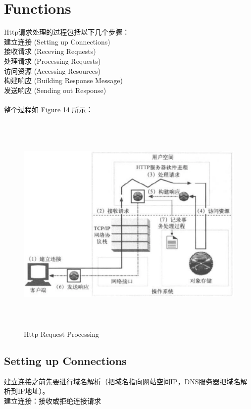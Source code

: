 \documentclass{article}
\begin{document}
	\section{Functions}
	\begin{CJK}{UTF8}{gbsn}
		Http请求处理的过程包括以下几个步骤：\\
		\indent 建立连接 (Setting up Connections)\\
		\indent 接收请求 (Receving Requests)\\
		\indent 处理请求 (Processing Requests)\\
		\indent 访问资源 (Accessing Resources)\\
		\indent 构建响应 (Building Response Message)\\
		\indent 发送响应 (Sending out Response)\\
		\hspace*{\fill} \\ %
		整个过程如 Figure 14 所示：
	\end{CJK}{}

	\begin{figure}[H]
		\centering
		\includegraphics[height = 11cm, width = 16cm]{pics/27_http_procedure.png}	
		\caption{Http Request Processing}
	\end{figure}

	\subsection{Setting up Connections}
	\begin{CJK}{UTF8}{gbsn}
		建立连接之前先要进行域名解析（把域名指向网站空间IP，DNS服务器把域名解析到IP地址）。\\
		建立连接：接收或拒绝连接请求
	\end{CJK}{}
\end{document}
